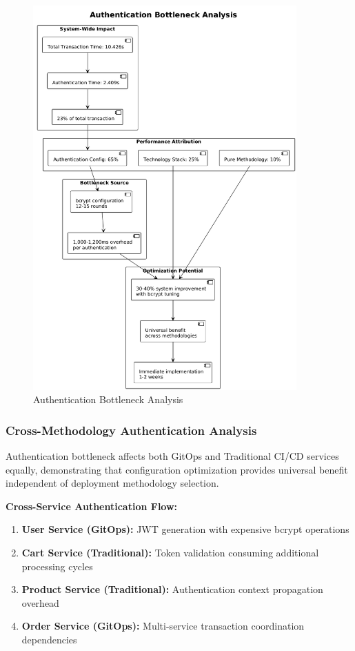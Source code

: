 \begin{figure}[H]
\centering
\includegraphics[width=0.9\textwidth]{figures/Authentication-Bottleneck-Analysis.png}
\caption{Authentication Bottleneck Analysis}
\label{fig:authentication-bottleneck-analysis}
\end{figure}


\subsubsection{Cross-Methodology Authentication Analysis}

Authentication bottleneck affects both GitOps and Traditional CI/CD services equally, demonstrating that configuration optimization provides universal benefit independent of deployment methodology selection.

\textbf{Cross-Service Authentication Flow:}
\begin{enumerate}
\item \textbf{User Service (GitOps):} JWT generation with expensive bcrypt operations
\item \textbf{Cart Service (Traditional):} Token validation consuming additional processing cycles
\item \textbf{Product Service (Traditional):} Authentication context propagation overhead
\item \textbf{Order Service (GitOps):} Multi-service transaction coordination dependencies
\end{enumerate}

